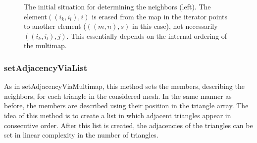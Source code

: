 \documentclass[10pt]{article}
\begin{document}
\begin{figure}[h]  
	\begin{minipage}{0.4\textwidth}
		
	\end{minipage}
	\hfill
	\begin{minipage}{0.4\textwidth}
		\vspace{1cm}
		
		
	\end{minipage}
	\caption{The initial situation for determining the neighbors (left). The element$ ((i_k,i_l),i) $ is erased from the map in the iterator points to another element ($((m,n),s)$ in this case), not necessarily $((i_k,i_l),j)$. This essentially depends on the internal ordering of the multimap.  }

\end{figure}


\subsubsection{setAdjacencyViaList} \label{list}
As in {\ttfamily setAdjacencyViaMultimap}, this method sets the members, describing the neighbors, for each triangle in the considered mesh. In the same manner as before, the members are described using their position in the triangle array. The idea of this method is to create a list in which adjacent triangles appear in consecutive order. After this list is created, the adjacencies of the triangles can be set in linear complexity in the number of triangles.
\end{document}
